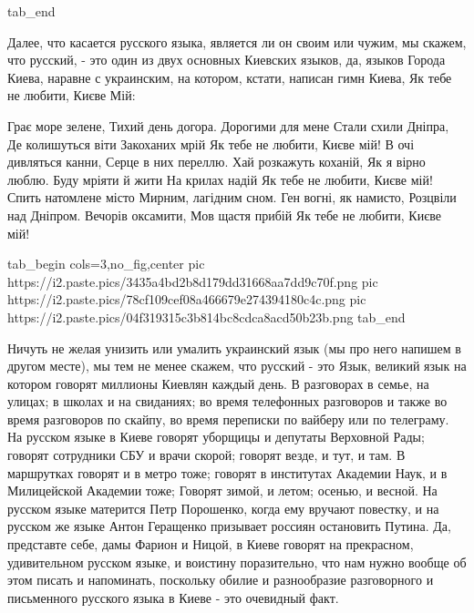 tab_end
\fi

Далее, что касается русского языка, является ли он своим или чужим, мы скажем,
что русский, - это один из двух основных Киевских языков, да, языков Города
Киева, наравне с украинским, на котором, кстати, написан гимн Киева, Як тебе не
любити, Києве Мій:

\raggedcolumns
\begin{multicols}{3} %
\setlength{\parindent}{0pt}
\obeycr
Грає море зелене,
Тихий день догора.
Дорогими для мене
Стали схили Дніпра,
Де колишуться віти
Закоханих мрій
Як тебе не любити,
Києве мій!
\smallskip
В очі дивляться канни,
Серце в них переллю.
Хай розкажуть коханій,
Як я вірно люблю.
Буду мріяти й жити
На крилах надій
Як тебе не любити,
Києве мій!
\smallskip
Спить натомлене місто
Мирним, лагідним сном.
Ген вогні, як намисто,
Розцвіли над Дніпром.
Вечорів оксамити,
Мов щастя прибій
Як тебе не любити,
Києве мій!
\restorecr
\end{multicols} %

\ifcmt
  tab_begin cols=3,no_fig,center
     pic https://i2.paste.pics/3435a4bd2b8d179dd31668aa7dd9c70f.png
		 pic https://i2.paste.pics/78cf109cef08a466679e274394180c4c.png 
		 pic https://i2.paste.pics/04f319315c3b814bc8cdca8acd50b23b.png
  tab_end
\fi

Ничуть не желая унизить или умалить украинский язык (мы про
него напишем в другом месте), мы тем не менее скажем, что русский - это Язык,
великий язык на котором говорят миллионы Киевлян каждый день. В разговорах в
семье, на улицах; в школах и на свиданиях; во время телефонных разговоров и
также во время разговоров по скайпу, во время переписки по вайберу или по
телеграму. На русском языке в Киеве говорят уборщицы и депутаты Верховной Рады;
говорят сотрудники СБУ и врачи скорой; говорят везде, и тут, и там. В
маршрутках говорят и в метро тоже; говорят в институтах Академии Наук, и в
Милицейской Академии тоже; Говорят зимой, и летом; осенью, и весной. На русском
языке матерится Петр Порошенко, когда ему вручают повестку, и на русском же
языке Антон Геращенко призывает россиян остановить Путина. Да, представте себе,
дамы Фарион и Ницой, в Киеве говорят на прекрасном, удивительном русском языке,
и воистину поразительно, что нам нужно вообще об этом писать и напоминать,
поскольку обилие и разнообразие разговорного и письменного русского языка в
Киеве - это очевидный факт. 

